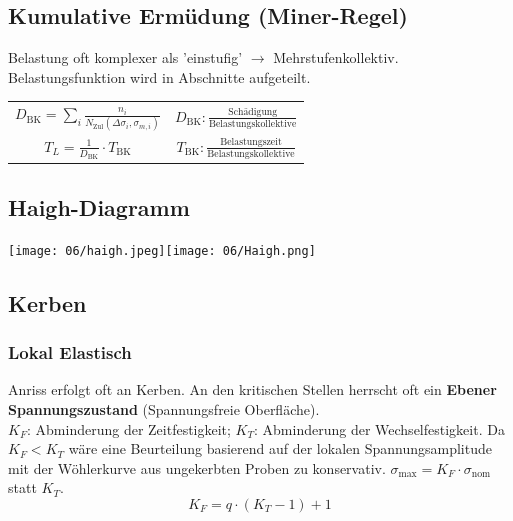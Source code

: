     \subsection{Kumulative Ermüdung (Miner-Regel)}
        Belastung oft komplexer als 'einstufig' $\rightarrow$ Mehrstufenkollektiv. Belastungsfunktion wird in Abschnitte aufgeteilt.
        \vspace{-2mm}
        \begin{center}
            \begin{tabular}{c c}
                $\boxed{D_{\textrm{BK}}= \sum_{i}\frac{n_{i}}{N_{\textrm{Zul}}(\Delta\sigma_{i},\sigma_{m,i})}}$ & $D_{\textrm{BK}}: \frac{\textrm{Schädigung}}{\textrm{Belastungskollektive}}$ \\
                $\boxed{T_{L}=\frac{1}{D_{\textrm{BK}}}\cdot T_{\textrm{BK}}}$ & $T_{\textrm{BK}}:\frac{\textrm{Belastungszeit}}{\textrm{Belastungskollektive}}$
            \end{tabular}
        \end{center}

    \subsection{Haigh-Diagramm}
        \begin{center}
            \texttt{[image: 06/haigh.jpeg]}\texttt{[image: 06/Haigh.png]}
        \end{center}

    \subsection{Kerben}
        \subsubsection{Lokal Elastisch}
            Anriss erfolgt oft an Kerben. An den kritischen Stellen herrscht oft ein \textbf{Ebener Spannungszustand} (Spannungsfreie Oberfläche).\\ $K_F$: Abminderung der Zeitfestigkeit; $K_T$: Abminderung der Wechselfestigkeit. Da $K_F < K_T$ wäre eine Beurteilung basierend auf der lokalen Spannungsamplitude mit der Wöhlerkurve aus ungekerbten Proben zu konservativ. $\sigma_{\textrm{max}}=K_F \cdot \sigma_{\textrm{nom}}$ statt $K_T$.
            \[\boxed{K_F = q\cdot(K_T-1)+1}\]
